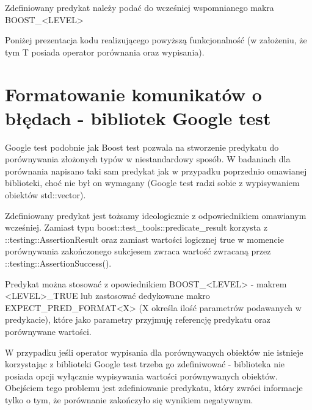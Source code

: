 \documentclass[12pt,a4paper,notitlepage]{report}
\begin{document}
Zdefiniowany predykat należy podać do wcześniej wspomnianego makra BOOST{\_}<LEVEL>

Poniżej prezentacja kodu realizującego powyższą funkcjonalność (w założeniu, że tym T posiada operator porównania oraz wypisania).

			

\section{Formatowanie komunikatów o błędach - bibliotek Google test}

Google test podobnie jak Boost test pozwala na stworzenie predykatu do porównywania złożonych typów w niestandardowy sposób. W badaniach dla porównania napisano taki sam predykat jak w przypadku poprzednio omawianej biblioteki, choć nie był on wymagany (Google test radzi sobie z wypisywaniem obiektów std::vector).

Zdefiniowany predykat jest tożsamy ideologicznie z odpowiednikiem omawianym wcześniej. Zamiast typu boost::test{\_}tools::predicate{\_}result korzysta z ::testing::AssertionResult oraz zamiast wartości logicznej true w momencie porównywania zakończonego sukcjesem zwraca wartość zwracaną przez ::testing::AssertionSuccess().

Predykat można stosować z opowiednikiem BOOST{\_}<LEVEL> - makrem <LEVEL>{\_}TRUE lub zastosować dedykowane makro EXPECT{\_}PRED{\_}FORMAT<X> (X określa ilość parametrów podawanych w predykacie), które jako parametry przyjmuję referencję predykatu oraz porównywane wartości.

			

W przypadku jeśli operator wypisania dla porównywanych obiektów nie istnieje korzystając z biblioteki Google test trzeba go zdefiniwować - biblioteka nie posiada opcji wyłącznie wypisywania wartości porównywanych obiektów. Obejściem tego problemu jest zdefiniowanie predykatu, który zwróci informacje tylko o tym, że porównanie zakończyło się wynikiem negatywnym.
\end{document}
